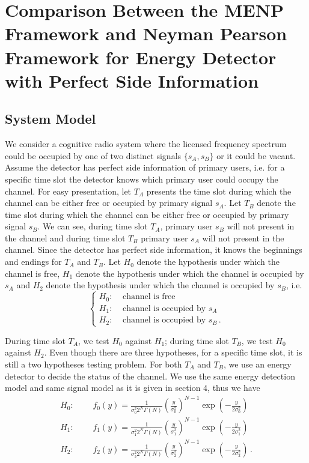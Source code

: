 \section{Comparison Between the MENP Framework and Neyman Pearson Framework for Energy Detector with Perfect Side Information }

\subsection{System Model}
\def \CHISQUY[#1]{\frac{1}{#1 2^N\Gamma(N)}\left(\frac{y}{#1}\right)^{N-1}\exp\left(-\frac{y}{2#1}\right)}
We consider a cognitive radio system where the licensed frequency spectrum could be occupied by one of two distinct signals $\{s_A, s_B\}$ or it could be vacant. 
Assume the detector has perfect side information of primary users, i.e. for a specific time slot the detector knows which primary user could occupy the channel. For easy presentation, let $T_A$ presents the time slot during which the channel can be either free or occupied by primary signal $s_A$. Let $T_B$ denote the time slot during which the channel can be either free or occupied by primary signal $s_B$. We can see, during time slot $T_A$, primary user $s_B$ will not present in the channel and during time slot $T_B$ primary user $s_A$ will not present in the channel. Since the detector has perfect side information, it knows the beginnings and endings for $T_A$ and $T_B$. Let $H_0$ denote the hypothesis under which the channel is free,  $H_1$ denote the hypothesis under which the channel is occupied by $s_A$ and $H_2$ denote the hypothesis under which the channel is occupied by $s_B$, i.e.
\begin{equation}
\begin{cases}
H_0:\;\;\;\;\text{channel is free}\\
H_1:\;\;\;\;\text{channel is occupied by $s_A$}\\
H_2:\;\;\;\;\text{channel is occupied by $s_B$}\,.
\end{cases}
\end{equation} 

During time slot $T_A$, we  test $H_0$ against $H_1$; during time slot $T_B$, we test $H_0$ against $H_2$. 
Even though there are three hypotheses, for a specific time slot, it is still a two hypotheses testing problem.   
For both $T_A$ and $T_B$, we use an energy detector to decide the status of the channel. 
We use the same energy detection model and same signal model as it is given in section 4, thus we have
\begin{equation}
  \label{20150627a2}
  \begin{split}
    H_0:\;\;\;\;\;&f_0(y) = \CHISQUY[\sigma_0^2]\\
    H_1:\;\;\;\;\;&f_{1}(y) = \CHISQUY[\sigma_1^2]\\
    H_2:\;\;\;\;\;&f_{2}(y) = \CHISQUY[\sigma_2^2]\,.
  \end{split}
\end{equation}

